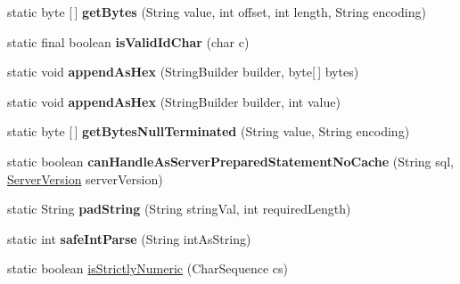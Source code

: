\begin{DoxyCompactItemize}
static byte \mbox{[}$\,$\mbox{]} {\bfseries get\+Bytes} (String value, int offset, int length, String encoding)
\item 
\mbox{\label{classcom_1_1mysql_1_1cj_1_1util_1_1_string_utils_ae5fe73848dc0997926faf1a422b7439f}} 
static final boolean {\bfseries is\+Valid\+Id\+Char} (char c)
\item 
\mbox{\label{classcom_1_1mysql_1_1cj_1_1util_1_1_string_utils_a3af23eb4bbd83ea2b0d535afb119d34e}} 
static void {\bfseries append\+As\+Hex} (String\+Builder builder, byte\mbox{[}$\,$\mbox{]} bytes)
\item 
\mbox{\label{classcom_1_1mysql_1_1cj_1_1util_1_1_string_utils_a39741a5f2e8f10ee2aedf405eaa8da55}} 
static void {\bfseries append\+As\+Hex} (String\+Builder builder, int value)
\item 
\mbox{\label{classcom_1_1mysql_1_1cj_1_1util_1_1_string_utils_a8b6ffc159e4cf0b6796526a963cdbe59}} 
static byte \mbox{[}$\,$\mbox{]} {\bfseries get\+Bytes\+Null\+Terminated} (String value, String encoding)
\item 
\mbox{\label{classcom_1_1mysql_1_1cj_1_1util_1_1_string_utils_a434e3b5a96c5c5c7b3b001766ecc44d5}} 
static boolean {\bfseries can\+Handle\+As\+Server\+Prepared\+Statement\+No\+Cache} (String sql, \mbox{\hyperlink{classcom_1_1mysql_1_1cj_1_1_server_version}{Server\+Version}} server\+Version)
\item 
\mbox{\label{classcom_1_1mysql_1_1cj_1_1util_1_1_string_utils_a43143dc6d2b0e3a46dc0c715d97f78ac}} 
static String {\bfseries pad\+String} (String string\+Val, int required\+Length)
\item 
\mbox{\label{classcom_1_1mysql_1_1cj_1_1util_1_1_string_utils_a424742b9ab9d0cf8e84eea0f13034f80}} 
static int {\bfseries safe\+Int\+Parse} (String int\+As\+String)
\item 
static boolean \mbox{\hyperlink{classcom_1_1mysql_1_1cj_1_1util_1_1_string_utils_acf95de676373ca2fd9f2ef4ea9cf20bd}{is\+Strictly\+Numeric}} (Char\+Sequence cs)

\end{DoxyCompactItemize}
